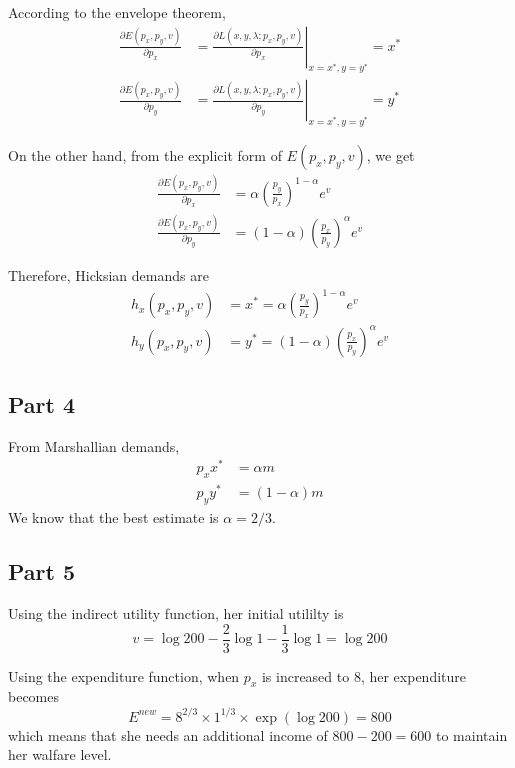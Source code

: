 \documentclass{article}
\begin{document}
According to the envelope theorem,
\begin{align*}
	\frac{\partial E(p_x,p_y,v)}{\partial p_x}&=\left.\frac{\partial L(x,y,\lambda;p_x,p_y,v)}{\partial p_x}\right|_{x=x^*,y=y^*}=x^*\\
	\frac{\partial E(p_x,p_y,v)}{\partial p_y}&=\left.\frac{\partial L(x,y,\lambda;p_x,p_y,v)}{\partial p_y}\right|_{x=x^*,y=y^*}=y^*
\end{align*}

On the other hand, from the explicit form of $E(p_x,p_y,v)$, we get
\begin{align*}
	\frac{\partial E(p_x,p_y,v)}{\partial p_x}&=\alpha\left(\frac{p_y}{p_x}\right)^{1-\alpha}e^v\\
	\frac{\partial E(p_x,p_y,v)}{\partial p_y}&=(1-\alpha)\left(\frac{p_x}{p_y}\right)^\alpha e^v
\end{align*}

Therefore, Hicksian demands are
\begin{align*}
	h_x(p_x,p_y,v)&=x^*=\alpha\left(\frac{p_y}{p_x}\right)^{1-\alpha}e^v\\
	h_y(p_x,p_y,v)&=y^*=(1-\alpha)\left(\frac{p_x}{p_y}\right)^\alpha e^v
\end{align*}

\subsection{Part 4}
From Marshallian demands,
\begin{align*}
	p_xx^*&=\alpha m\\
	p_yy^*&=(1-\alpha)m
\end{align*}
We know that the best estimate is $\alpha=2/3$.

\subsection{Part 5}
Using the indirect utility function, her initial utililty is
\begin{equation*}
	v=\log200-\frac{2}{3}\log1-\frac{1}{3}\log1=\log200
\end{equation*}

Using the expenditure function, when $p_x$ is increased to $8$, her expenditure becomes
\begin{equation*}
	E^{new}=8^{2/3}\times1^{1/3}\times\exp(\log200)=800
\end{equation*}
which means that she needs an additional income of $800-200=600$ to maintain her walfare level.
\end{document}
